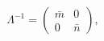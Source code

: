\begin{equation}
\Lambda^{-1} = \left(
\begin{array}{cc}
\bar{m} & 0\\
0 & \bar{n}
\end{array}
\right),
\end{equation}

